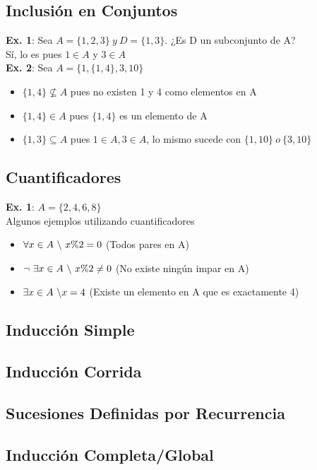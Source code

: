 \documentclass[10pt,a4paper]{article}
\begin{document}
\subsection*{Inclusión en Conjuntos}
\label{subsec:inclusion_conjuntos}
\textbf{Ex. 1}: Sea $A = \{1, 2, 3\} \ y \ D = \{1, 3\}$. ¿Es D un subconjunto de A? \\
Sí, lo es pues $1 \in A$ y $ 3 \in A$ \\
\textbf{Ex. 2}: Sea $A = \{1, \{1, 4\}, 3, 10\}$
\begin{itemize}
    \item $ \{1, 4\} \nsubseteq A $ pues no existen 1 y 4 como elementos en A
    \item $ \{1, 4\} \in A $ pues $\{1, 4\}$ es un elemento de A
    \item $\{1, 3\} \subseteq A$ pues $ 1 \in A, 3 \in A$, lo mismo sucede con $ \{1, 10\} \ o \ \{3, 10\}$
\end{itemize}
\subsection*{Cuantificadores}
\label{subsec:cuantificadores}
\textbf{Ex. 1}: $A = \{2, 4, 6, 8\}$ \\
Algunos ejemplos utilizando cuantificadores 
\begin{itemize}
    \item $\forall x \in A \ \symbol{92} \ x \% 2 = 0$ (Todos pares en A)
    \item $\neg \ \exists x \in A \ \symbol{92} \ x \% 2 \neq 0$ (No existe ningún impar en A) 
    \item $ \exists x \in A \ \symbol{92} x = 4$ (Existe un elemento en A que es exactamente 4)
\end{itemize}
\subsection*{Inducción Simple}
\label{subsec:induccion_simple}
\subsection*{Inducción Corrida}
\label{subsec:induccion_corrida}
\subsection*{Sucesiones Definidas por Recurrencia}
\label{subsec:sucesiones_recurrencia}
\subsection*{Inducción Completa/Global}
\label{subsec:induccion_completa}
\end{document}
